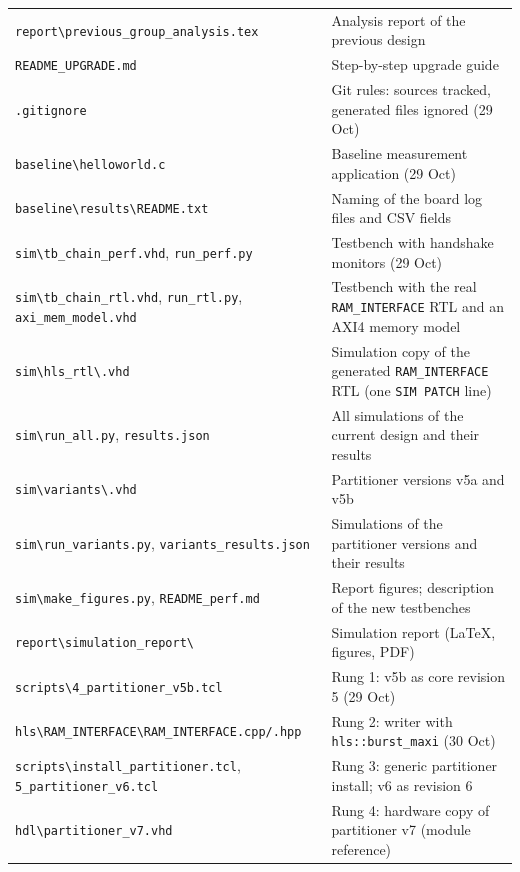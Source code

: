 \documentclass[11pt,a4paper]{article}
\newcommand{\code}[1]{\texttt{#1}}
\begin{document}
\begin{longtable}{@{}p{}p{}@{}}
\code{report\textbackslash previous\_group\_analysis.tex} & Analysis report of the previous design \\
\code{README\_UPGRADE.md} & Step-by-step upgrade guide \\
\code{.gitignore} & Git rules: sources tracked, generated files ignored (29 Oct) \\
\code{baseline\textbackslash helloworld.c} & Baseline measurement application (29 Oct) \\
\code{baseline\textbackslash results\textbackslash README.txt} & Naming of the board log files and CSV fields \\
\code{sim\textbackslash tb\_chain\_perf.vhd}, \code{run\_perf.py} & Testbench with handshake monitors (29 Oct) \\
\code{sim\textbackslash tb\_chain\_rtl.vhd}, \code{run\_rtl.py}, \code{axi\_mem\_model.vhd} & Testbench with the real \code{RAM\_INTERFACE} RTL and an AXI4 memory model \\
\code{sim\textbackslash hls\_rtl\textbackslash *.vhd} & Simulation copy of the generated \code{RAM\_INTERFACE} RTL (one \code{SIM PATCH} line) \\
\code{sim\textbackslash run\_all.py}, \code{results.json} & All simulations of the current design and their results \\
\code{sim\textbackslash variants\textbackslash *.vhd} & Partitioner versions v5a and v5b \\
\code{sim\textbackslash run\_variants.py}, \code{variants\_results.json} & Simulations of the partitioner versions and their results \\
\code{sim\textbackslash make\_figures.py}, \code{README\_perf.md} & Report figures; description of the new testbenches \\
\code{report\textbackslash simulation\_report\textbackslash *} & Simulation report (\LaTeX{}, figures, PDF) \\
\code{scripts\textbackslash 4\_partitioner\_v5b.tcl} & Rung 1: v5b as core revision 5 (29 Oct) \\
\code{hls\textbackslash RAM\_INTERFACE\textbackslash}\allowbreak\code{RAM\_INTERFACE.cpp/.hpp} & Rung 2: writer with \code{hls::burst\_maxi} (30 Oct) \\
\code{scripts\textbackslash install\_partitioner.tcl}, \code{5\_partitioner\_v6.tcl} & Rung 3: generic partitioner install; v6 as revision 6 \\
\code{hdl\textbackslash partitioner\_v7.vhd} & Rung 4: hardware copy of partitioner v7 (module reference) \\

\end{longtable}
\end{document}
